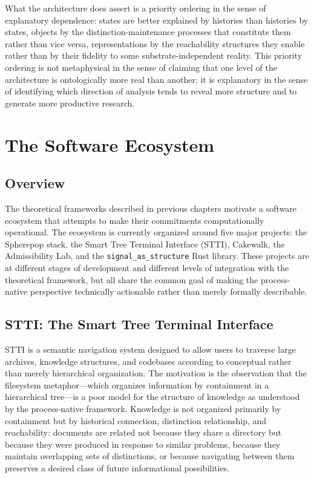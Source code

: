 \documentclass[11pt, oneside]{book}
\theoremstyle{definition}
\theoremstyle{remark}
\begin{document}
What the architecture does assert is a priority ordering in the sense of explanatory dependence: states are better explained by histories than histories by states, objects by the distinction-maintenance processes that constitute them rather than vice versa, representations by the reachability structures they enable rather than by their fidelity to some substrate-independent reality. This priority ordering is not metaphysical in the sense of claiming that one level of the architecture is ontologically more real than another; it is explanatory in the sense of identifying which direction of analysis tends to reveal more structure and to generate more productive research.

\chapter{The Software Ecosystem}

\section{Overview}

The theoretical frameworks described in previous chapters motivate a software ecosystem that attempts to make their commitments computationally operational. The ecosystem is currently organized around five major projects: the Spherepop stack, the Smart Tree Terminal Interface (STTI), Cakewalk, the Admissibility Lab, and the \texttt{signal\_as\_structure} Rust library. These projects are at different stages of development and different levels of integration with the theoretical framework, but all share the common goal of making the process-native perspective technically actionable rather than merely formally describable.

\section{STTI: The Smart Tree Terminal Interface}

STTI is a semantic navigation system designed to allow users to traverse large archives, knowledge structures, and codebases according to conceptual rather than merely hierarchical organization. The motivation is the observation that the filesystem metaphor—which organizes information by containment in a hierarchical tree—is a poor model for the structure of knowledge as understood by the process-native framework. Knowledge is not organized primarily by containment but by historical connection, distinction relationship, and reachability: documents are related not because they share a directory but because they were produced in response to similar problems, because they maintain overlapping sets of distinctions, or because navigating between them preserves a desired class of future informational possibilities.
\end{document}
